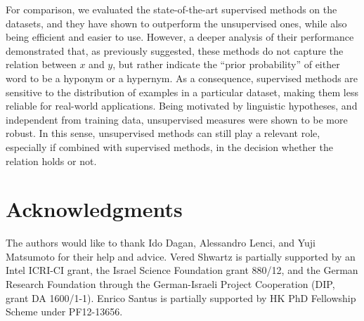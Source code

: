 \documentclass[11pt]{article}
\begin{document}
For comparison, we evaluated the state-of-the-art supervised methods on the datasets, and they have shown to outperform the unsupervised ones, while also being efficient and easier to use. However, a deeper analysis of their performance demonstrated that, as previously suggested, these methods do not capture the relation between $x$ and $y$, but rather indicate the ``prior probability'' of either word to be a hyponym or a hypernym. As a consequence, supervised methods are sensitive to the distribution of examples in a particular dataset, making them less reliable for real-world applications. Being motivated by linguistic hypotheses, and independent from training data, unsupervised measures were shown to be more robust. In this sense, unsupervised methods can still play a relevant role, especially if combined with supervised methods, in the decision whether the relation holds or not.



\section*{Acknowledgments}

The authors would like to thank Ido Dagan, Alessandro Lenci, and Yuji Matsumoto for their help and advice.
Vered Shwartz is partially supported by an Intel ICRI-CI grant, the Israel Science Foundation grant 880/12, and the German Research Foundation through the German-Israeli Project Cooperation (DIP, grant DA 1600/1-1).
Enrico Santus is partially supported by HK PhD Fellowship Scheme under PF12-13656.




\end{document}
